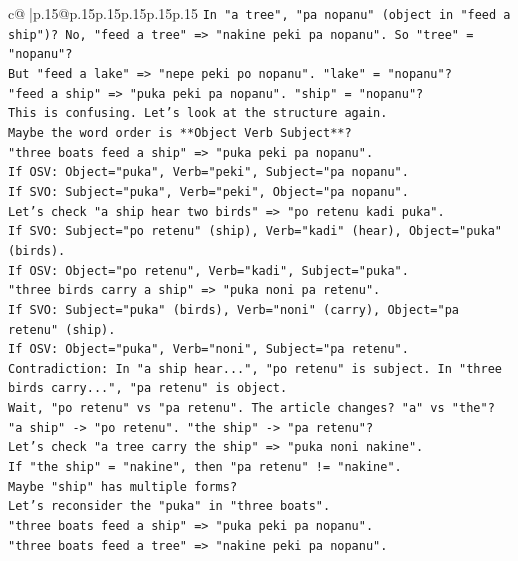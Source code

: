 \documentclass{article}
\begin{document}
{\begin{supertabular}{c@{$\;$}|p{.15\linewidth}@{}p{.15\linewidth}p{.15\linewidth}p{.15\linewidth}p{.15\linewidth}p{.15\linewidth}}
{{{\texttt{In "a tree", "pa nopanu" (object in "feed a ship")? No, "feed a tree" => "nakine peki pa nopanu". So "tree" = "nopanu"?} \\
\texttt{But "feed a lake" => "nepe peki po nopanu". "lake" = "nopanu"?} \\
\texttt{"feed a ship" => "puka peki pa nopanu". "ship" = "nopanu"?} \\
\texttt{This is confusing. Let's look at the structure again.} \\
\texttt{Maybe the word order is **Object Verb Subject**?} \\
\texttt{"three boats feed a ship" => "puka peki pa nopanu".} \\
\texttt{If OSV: Object="puka", Verb="peki", Subject="pa nopanu".} \\
\texttt{If SVO: Subject="puka", Verb="peki", Object="pa nopanu".} \\
\texttt{Let's check "a ship hear two birds" => "po retenu kadi puka".} \\
\texttt{If SVO: Subject="po retenu" (ship), Verb="kadi" (hear), Object="puka" (birds).} \\
\texttt{If OSV: Object="po retenu", Verb="kadi", Subject="puka".} \\
\texttt{"three birds carry a ship" => "puka noni pa retenu".} \\
\texttt{If SVO: Subject="puka" (birds), Verb="noni" (carry), Object="pa retenu" (ship).} \\
\texttt{If OSV: Object="puka", Verb="noni", Subject="pa retenu".} \\
\texttt{Contradiction: In "a ship hear...", "po retenu" is subject. In "three birds carry...", "pa retenu" is object.} \\
\texttt{Wait, "po retenu" vs "pa retenu". The article changes? "a" vs "the"?} \\
\texttt{"a ship" {-}> "po retenu". "the ship" {-}> "pa retenu"?} \\
\texttt{Let's check "a tree carry the ship" => "puka noni nakine".} \\
\texttt{If "the ship" = "nakine", then "pa retenu" != "nakine".} \\
\texttt{Maybe "ship" has multiple forms?} \\
\texttt{Let's reconsider the "puka" in "three boats".} \\
\texttt{"three boats feed a ship" => "puka peki pa nopanu".} \\
\texttt{"three boats feed a tree" => "nakine peki pa nopanu".} \\
}}}
\end{supertabular}}
\end{document}

